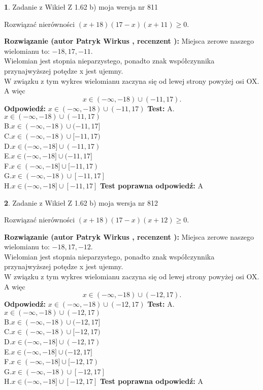 \documentclass[12pt, a4paper]{article}
\theoremstyle{definition} %
\newtheorem{zad}{}
\newcommand{\zadStart}[1]{\begin{zad}#1\newline}
\newcommand{\zadStop}{\end{zad}}
\newcommand{\rozwStart}[2]{\noindent \textbf{Rozwiązanie (autor #1 , recenzent #2): }\newline}
\newcommand{\rozwStop}{\newline}
\newcommand{\odpStart}{\noindent \textbf{Odpowiedź:}\newline}
\newcommand{\odpStop}{\newline}
\newcommand{\testStart}{\noindent \textbf{Test:}\newline}
\newcommand{\testStop}{\newline}
\newcommand{\kluczStart}{\noindent \textbf{Test poprawna odpowiedź:}\newline}
\newcommand{\kluczStop}{\newline}
\begin{document}
\zadStart{Zadanie z Wikieł Z 1.62 b) moja wersja nr 811}

Rozwiązać nierówności $(x+18)(17-x)(x+11)\ge0$.
\zadStop
\rozwStart{Patryk Wirkus}{}
Miejsca zerowe naszego wielomianu to: $-18, 17, -11$.\\
Wielomian jest stopnia nieparzystego, ponadto znak współczynnika przy\linebreak najwyższej potędze x jest ujemny.\\ W związku z tym wykres wielomianu zaczyna się od lewej strony powyżej osi OX. A więc $$x \in (-\infty,-18) \cup (-11,17).$$
\rozwStop
\odpStart
$x \in (-\infty,-18) \cup (-11,17)$
\odpStop
\testStart
A.$x \in (-\infty,-18) \cup (-11,17)$\\
B.$x \in (-\infty,-18) \cup (-11,17]$\\
C.$x \in (-\infty,-18) \cup [-11,17)$\\
D.$x \in (-\infty,-18] \cup (-11,17)$\\
E.$x \in (-\infty,-18] \cup (-11,17]$\\
F.$x \in (-\infty,-18] \cup [-11,17)$\\
G.$x \in (-\infty,-18) \cup [-11,17]$\\
H.$x \in (-\infty,-18] \cup [-11,17]$
\testStop
\kluczStart
A
\kluczStop



\zadStart{Zadanie z Wikieł Z 1.62 b) moja wersja nr 812}

Rozwiązać nierówności $(x+18)(17-x)(x+12)\ge0$.
\zadStop
\rozwStart{Patryk Wirkus}{}
Miejsca zerowe naszego wielomianu to: $-18, 17, -12$.\\
Wielomian jest stopnia nieparzystego, ponadto znak współczynnika przy\linebreak najwyższej potędze x jest ujemny.\\ W związku z tym wykres wielomianu zaczyna się od lewej strony powyżej osi OX. A więc $$x \in (-\infty,-18) \cup (-12,17).$$
\rozwStop
\odpStart
$x \in (-\infty,-18) \cup (-12,17)$
\odpStop
\testStart
A.$x \in (-\infty,-18) \cup (-12,17)$\\
B.$x \in (-\infty,-18) \cup (-12,17]$\\
C.$x \in (-\infty,-18) \cup [-12,17)$\\
D.$x \in (-\infty,-18] \cup (-12,17)$\\
E.$x \in (-\infty,-18] \cup (-12,17]$\\
F.$x \in (-\infty,-18] \cup [-12,17)$\\
G.$x \in (-\infty,-18) \cup [-12,17]$\\
H.$x \in (-\infty,-18] \cup [-12,17]$
\testStop
\kluczStart
A
\kluczStop
\end{document}
